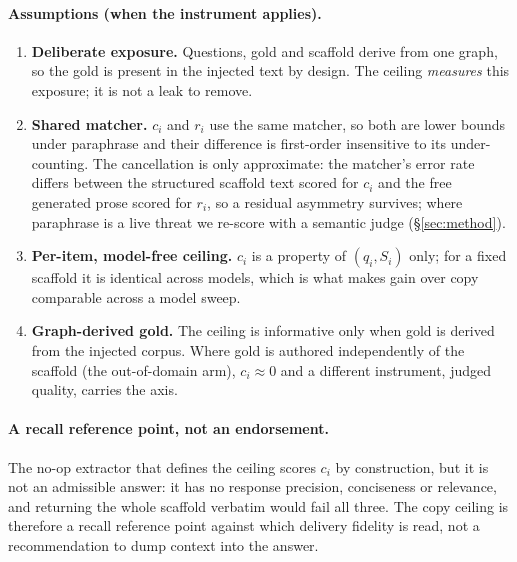 \documentclass[10pt,twocolumn]{article}
\begin{document}
\paragraph{Assumptions (when the instrument applies).}
\begin{enumerate}[label=(A\arabic*),topsep=2pt,itemsep=1pt,leftmargin=2.4em]
\item \textbf{Deliberate exposure.} Questions, gold and scaffold derive from one graph, so the gold
is present in the injected text by design. The ceiling \emph{measures} this exposure; it is not a
leak to remove.
\item \textbf{Shared matcher.} $c_i$ and $r_i$ use the same matcher, so both are lower bounds under
paraphrase and their difference is first-order insensitive to its under-counting. The cancellation is
only approximate: the matcher's error rate differs between the structured scaffold text scored for
$c_i$ and the free generated prose scored for $r_i$, so a residual asymmetry survives; where paraphrase
is a live threat we re-score with a semantic judge (\S\ref{sec:method}).
\item \textbf{Per-item, model-free ceiling.} $c_i$ is a property of $(q_i,S_i)$ only; for a fixed
scaffold it is identical across models, which is what makes gain over copy comparable across a model
sweep.
\item \textbf{Graph-derived gold.} The ceiling is informative only when gold is derived from the
injected corpus. Where gold is authored independently of the scaffold (the out-of-domain arm),
$c_i\approx0$ and a different instrument, judged quality, carries the axis.
\end{enumerate}

\paragraph{A recall reference point, not an endorsement.} The no-op extractor that defines the ceiling
scores $c_i$ by construction, but it is not an admissible answer: it has no response precision,
conciseness or relevance, and returning the whole scaffold verbatim would fail all three. The copy
ceiling is therefore a recall reference point against which delivery fidelity is read, not a
recommendation to dump context into the answer.
\end{document}
